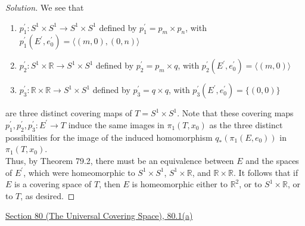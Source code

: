 \documentclass[11pt]{article}
\newcommand{\R}{\mathbb{R}}
\newenvironment{solution}
  {\renewcommand\qedsymbol{$\blacksquare$}\begin{proof}[Solution]}
  {\end{proof}}
\begin{document}
\begin{solution}
We see that 
\begin{enumerate}
    \item $p^{\prime}_1 \colon S^1 \times S^1 \rightarrow S^1 \times S^1$ defined by $p^{\prime}_1 = p_m \times p_n$, with $p^{\prime}_1(E^{\prime}, e^{\prime}_0) = \langle (m, 0), (0, n) \rangle$
    \item $p^{\prime}_2 \colon S^1 \times \R \rightarrow S^1 \times S^1$ defined by $p^{\prime}_2 = p_m \times q$, with $p^{\prime}_2(E^{\prime}, e^{\prime}_0) = \langle (m, 0) \rangle$
    \item $p^{\prime}_3 \colon \R \times \R \rightarrow S^1 \times S^1$ defined by $p^{\prime}_3 = q \times q$, with $p^{\prime}_3(E^{\prime}, e^{\prime}_0) = \{ (0, 0) \}$
\end{enumerate}
are three distinct covering maps of $T = S^1 \times S^1$. Note that these covering maps $p^{\prime}_1, p^{\prime}_2, p^{\prime}_3 \colon E^{\prime} \rightarrow T$ induce the same images in $\pi_1(T, x_0)$ 
as the three distinct possibilities for the image of the induced homomorphism $q_{\ast}(\pi_1(E, e_0))$ in $\pi_1(T, x_0)$. \\

Thus, by Theorem 79.2, there must be an equivalence between $E$ and the spaces of $E^{\prime}$, which were homeomorphic to $S^1 \times S^1$, $S^1 \times \R$, and $\R \times \R$. 
It follows that if $E$ is a covering space of $T$, then $E$ is homeomorphic either to $\R^2$, or to $S^1 \times \R$, or to $T$, as desired.
\end{solution}

\newpage

\underline{Section 80 (The Universal Covering Space), 80.1(a)} \\
\end{document}
